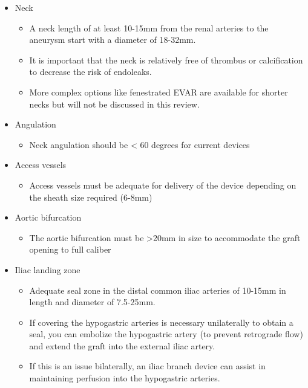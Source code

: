 \documentclass[
]{book}
\providecommand{\tightlist}{%
  \setlength{\itemsep}{0pt}\setlength{\parskip}{0pt}}
\begin{document}
\begin{itemize}
  \begin{itemize}
  \item
    Neck

    \begin{itemize}
    \item
      A neck length of at least 10-15mm from the renal arteries to
      the aneurysm start with a diameter of 18-32mm.
    \item
      It is important that the neck is relatively free of thrombus
      or calcification to decrease the risk of endoleaks.
    \item
      More complex options like fenestrated EVAR are available for
      shorter necks but will not be discussed in this review.
    \end{itemize}
  \item
    Angulation

    \begin{itemize}
    \tightlist
    \item
      Neck angulation should be \textless{} 60 degrees for current devices
    \end{itemize}
  \item
    Access vessels

    \begin{itemize}
    \tightlist
    \item
      Access vessels must be adequate for delivery of the device
      depending on the sheath size required (6-8mm)
    \end{itemize}
  \item
    Aortic bifurcation

    \begin{itemize}
    \tightlist
    \item
      The aortic bifurcation must be \textgreater20mm in size to accommodate
      the graft opening to full caliber
    \end{itemize}
  \item
    Iliac landing zone

    \begin{itemize}
    \item
      Adequate seal zone in the distal common iliac arteries of
      10-15mm in length and diameter of 7.5-25mm.
    \item
      If covering the hypogastric arteries is necessary
      unilaterally to obtain a seal, you can embolize the
      hypogastric artery (to prevent retrograde flow) and extend
      the graft into the external iliac artery.
    \item
      If this is an issue bilaterally, an iliac branch device can
      assist in maintaining perfusion into the hypogastric
      arteries.
    \end{itemize}
  \end{itemize}
\end{itemize}
\end{document}
